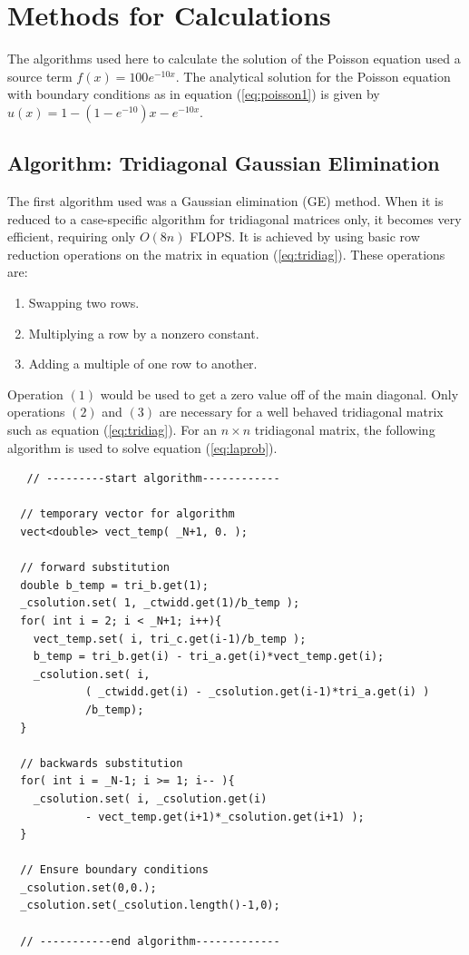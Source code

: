 \documentclass[a4paper,12pt]{report}
\begin{document}
\section{Methods for Calculations}
The algorithms used here to calculate the solution of the Poisson equation used a source term $f(x) = 100e^{-10x}$. The analytical solution for the Poisson equation with boundary conditions as in equation (\ref{eq:poisson1}) is given by $u(x) = 1-(1-e^{-10})x-e^{-10x}$.
\subsection{Algorithm: Tridiagonal Gaussian Elimination}
The first algorithm used was a Gaussian elimination (GE) method. When it is reduced to a case-specific algorithm for tridiagonal matrices only, it becomes very efficient, requiring only $O(8n)$ FLOPS. It is achieved by using basic row reduction operations on the matrix in equation (\ref{eq:tridiag}). These operations are:
\begin{enumerate}
 \item Swapping two rows.
 \item Multiplying a row by a nonzero constant.
 \item Adding a multiple of one row to another.
\end{enumerate}

Operation $(1)$ would be used to get a zero value off of the main diagonal. Only operations $(2)$ and $(3)$ are necessary for a well behaved tridiagonal matrix such as equation (\ref{eq:tridiag}). For an $n\times n$ tridiagonal matrix, the following algorithm is used to solve equation (\ref{eq:laprob}).

\singlespacing
\begin{verbatim}
   // ---------start algorithm------------

  // temporary vector for algorithm
  vect<double> vect_temp( _N+1, 0. );

  // forward substitution
  double b_temp = tri_b.get(1);
  _csolution.set( 1, _ctwidd.get(1)/b_temp );
  for( int i = 2; i < _N+1; i++){
    vect_temp.set( i, tri_c.get(i-1)/b_temp );
    b_temp = tri_b.get(i) - tri_a.get(i)*vect_temp.get(i);
    _csolution.set( i, 
		    ( _ctwidd.get(i) - _csolution.get(i-1)*tri_a.get(i) )
		    /b_temp);
  }

  // backwards substitution
  for( int i = _N-1; i >= 1; i-- ){
    _csolution.set( i, _csolution.get(i) 
		    - vect_temp.get(i+1)*_csolution.get(i+1) );
  }

  // Ensure boundary conditions
  _csolution.set(0,0.);
  _csolution.set(_csolution.length()-1,0);

  // -----------end algorithm-------------

\end{verbatim}
\doublespacing
\end{document}
